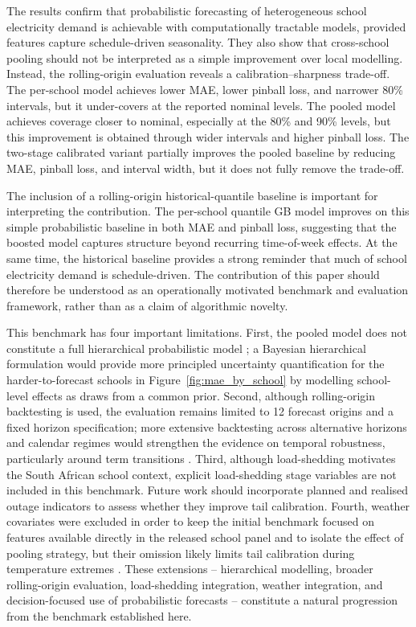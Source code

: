 \documentclass[12pt,a4paper]{article}
\begin{document}
The results confirm that probabilistic forecasting of heterogeneous school electricity demand is achievable with computationally tractable models, provided features capture schedule-driven seasonality. They also show that cross-school pooling should not be interpreted as a simple improvement over local modelling. Instead, the rolling-origin evaluation reveals a calibration--sharpness trade-off. The per-school model achieves lower MAE, lower pinball loss, and narrower 80\% intervals, but it under-covers at the reported nominal levels. The pooled model achieves coverage closer to nominal, especially at the 80\% and 90\% levels, but this improvement is obtained through wider intervals and higher pinball loss. The two-stage calibrated variant partially improves the pooled baseline by reducing MAE, pinball loss, and interval width, but it does not fully remove the trade-off.

The inclusion of a rolling-origin historical-quantile baseline is important for interpreting the contribution. The per-school quantile GB model improves on this simple probabilistic baseline in both MAE and pinball loss, suggesting that the boosted model captures structure beyond recurring time-of-week effects. At the same time, the historical baseline provides a strong reminder that much of school electricity demand is schedule-driven. The contribution of this paper should therefore be understood as an operationally motivated benchmark and evaluation framework, rather than as a claim of algorithmic novelty.

This benchmark has four important limitations. First, the pooled model does not constitute a full hierarchical probabilistic model \citep{bentaieb2021}; a Bayesian hierarchical formulation would provide more principled uncertainty quantification for the harder-to-forecast schools in Figure~\ref{fig:mae_by_school} by modelling school-level effects as draws from a common prior. Second, although rolling-origin backtesting is used, the evaluation remains limited to 12 forecast origins and a fixed horizon specification; more extensive backtesting across alternative horizons and calendar regimes would strengthen the evidence on temporal robustness, particularly around term transitions \citep{hyndman2021}. Third, although load-shedding motivates the South African school context, explicit load-shedding stage variables are not included in this benchmark. Future work should incorporate planned and realised outage indicators to assess whether they improve tail calibration. Fourth, weather covariates were excluded in order to keep the initial benchmark focused on features available directly in the released school panel and to isolate the effect of pooling strategy, but their omission likely limits tail calibration during temperature extremes \citep{haben2019}. These extensions -- hierarchical modelling, broader rolling-origin evaluation, load-shedding integration, weather integration, and decision-focused use of probabilistic forecasts -- constitute a natural progression from the benchmark established here.
\end{document}
